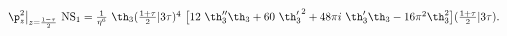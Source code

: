 \begin{equation}
  \begin{array}{l}
\p_z^2\big|_{z={1-\tau\over 2}} ~{\rm NS}_1 
= {1\over\eta^6} ~\th_3({1+\tau\over 2}|3\tau)^4 ~\big[
  12~\th_3''\th_3 + 60~{\th_3'}^2 + 48 \pi i~\th_3'\th_3 - 16\pi^2
  \th_3^2 \big] ({1+\tau\over 2}|3\tau). 
\end{array}
\end{equation}

